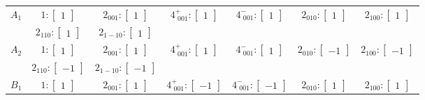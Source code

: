\documentclass[fleqn,8pt,landscape]{jsarticle}
\begin{document}
\begin{longtable}{ccccccc}
$ A_{1} $ & $ 1:\begin{bmatrix} 1 \end{bmatrix} $ & $ 2{}_{001}:\begin{bmatrix} 1 \end{bmatrix} $ & $ 4^{+}_{\,\,001}:\begin{bmatrix} 1 \end{bmatrix} $ & $ 4^{-}_{\,\,001}:\begin{bmatrix} 1 \end{bmatrix} $ & $ 2{}_{010}:\begin{bmatrix} 1 \end{bmatrix} $ & $ 2{}_{100}:\begin{bmatrix} 1 \end{bmatrix} $ \\
& $ 2{}_{110}:\begin{bmatrix} 1 \end{bmatrix} $ & $ 2{}_{1-10}:\begin{bmatrix} 1 \end{bmatrix} $ & $  $ & $  $ & $  $ & $  $ \\ \hline
$ A_{2} $ & $ 1:\begin{bmatrix} 1 \end{bmatrix} $ & $ 2{}_{001}:\begin{bmatrix} 1 \end{bmatrix} $ & $ 4^{+}_{\,\,001}:\begin{bmatrix} 1 \end{bmatrix} $ & $ 4^{-}_{\,\,001}:\begin{bmatrix} 1 \end{bmatrix} $ & $ 2{}_{010}:\begin{bmatrix} -1 \end{bmatrix} $ & $ 2{}_{100}:\begin{bmatrix} -1 \end{bmatrix} $ \\
& $ 2{}_{110}:\begin{bmatrix} -1 \end{bmatrix} $ & $ 2{}_{1-10}:\begin{bmatrix} -1 \end{bmatrix} $ & $  $ & $  $ & $  $ & $  $ \\ \hline
$ B_{1} $ & $ 1:\begin{bmatrix} 1 \end{bmatrix} $ & $ 2{}_{001}:\begin{bmatrix} 1 \end{bmatrix} $ & $ 4^{+}_{\,\,001}:\begin{bmatrix} -1 \end{bmatrix} $ & $ 4^{-}_{\,\,001}:\begin{bmatrix} -1 \end{bmatrix} $ & $ 2{}_{010}:\begin{bmatrix} 1 \end{bmatrix} $ & $ 2{}_{100}:\begin{bmatrix} 1 \end{bmatrix} $ \\

\end{longtable}
\end{document}
